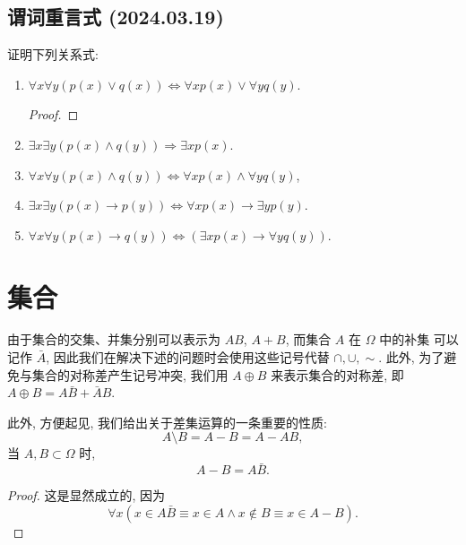 \documentclass[10pt,UTF8]{book} %
\begin{document}
\section{谓词重言式 (2024.03.19)}

\begin{exercise}
    证明下列关系式:
    \begin{enumerate}[label={$\left(\arabic*\right)$}, itemsep=0pt]
        \item $\forall x \forall y \left(
            p(x) \vee q(x)
        \right) \iff \forall x p(x) \vee \forall y q(y)$.
        \begin{proof}
            
        \end{proof}
        \item $\exists x \exists y \left(
            p(x) \wedge q(y)
        \right) \Longrightarrow \exists x p(x)$.
        \item $\forall x \forall y \left(
            p(x) \wedge q(y)
        \right) \iff \forall x p(x) \wedge \forall y q(y)$,
        \item $\exists x \exists y \left(
            p(x) \rightarrow p(y)
        \right) \iff \forall x p(x) \to \exists y p(y)$.
        \item $\forall x \forall y \left(
            p(x) \to q(y)
        \right) \iff \left(
            \exists x p(x) \to \forall y q(y)
        \right)$.
    \end{enumerate}
\end{exercise}

\chapter{集合}

由于集合的交集、并集分别可以表示为 $AB$, $A+B$, 而集合 $A$ 在 $\varOmega$ 中的补集
可以记作 $\bar A$, 因此我们在解决下述的问题时会使用这些记号代替 $\cap, \cup, \sim$.
此外, 为了避免与集合的对称差产生记号冲突, 我们用 $A \oplus B$ 来表示集合的对称差,
即 $A \oplus B = A \bar B + \bar A B$.

此外, 方便起见, 我们给出关于差集运算的一条重要的性质:
\[ A \setminus B = A - B = A - AB, \]
当 $A, B \subset \varOmega$ 时, 
\[ A - B = A \bar B. \]
\begin{proof}
    这是显然成立的, 因为
    \[ \forall x \left(
        x \in A\bar B
        \equiv x \in A \wedge x \notin B 
        \equiv x \in A - B
    \right). \]
\end{proof}
\end{document}
